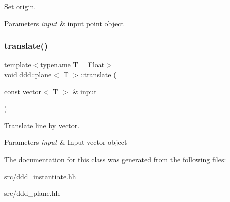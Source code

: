 Set origin. 


\begin{DoxyParams}{Parameters}
{\em input} & input point object \\
\hline
\end{DoxyParams}
\mbox{\label{classddd_1_1plane_a452cbfa144468d3748b424b18f045c24}} 
\subsubsection{\texorpdfstring{translate()}{translate()}}
{\footnotesize\ttfamily template$<$typename T = Float$>$ \\
void \hyperlink{classddd_1_1plane}{ddd\+::plane}$<$ T $>$\+::translate (\begin{DoxyParamCaption}\item[{const \hyperlink{classddd_1_1vector}{vector}$<$ T $>$ \&}]{input }\end{DoxyParamCaption})\hspace{0.3cm}{\ttfamily [inline]}}



Translate line by vector. 


\begin{DoxyParams}{Parameters}
{\em input} & Input vector object \\
\hline
\end{DoxyParams}


The documentation for this class was generated from the following files\+:\begin{DoxyCompactItemize}
\item 
src/ddd\+\_\+instantiate.\+hh\item 
src/ddd\+\_\+plane.\+hh\end{DoxyCompactItemize}
